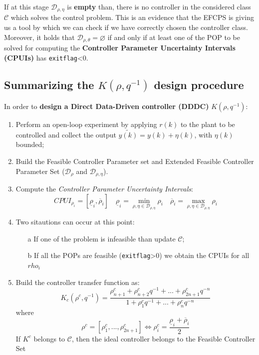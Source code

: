 If at this stage $\mathcal{D}_{\rho,\eta}$ is \textbf{empty} than, there is no controller in the considered class $\mathcal{C}$ which solves the control problem. This is an evidence that the EFCPS is giving us a tool by which we can check if we have correctly chosen the controller class. \\
Moreover, it holds that $\mathcal{D}_{\rho, \theta}=\varnothing $ if and only if at least one of the POP to be solved for computing the \textbf{Controller Parameter Uncertainty Intervals (CPUIs)} has \texttt{exitflag}<0. 

\subsection{Summarizing the $K(\rho,q^{-1})$ design procedure}
In order to \textbf{design a Direct Data-Driven controller (DDDC)} $K(\rho,q^{-1})$: 
\begin{enumerate}
    \itemsep-0.3em
    \item Perform an open-loop experiment by applying $r(k)$ to the plant to be controlled and collect the output $\tilde{y(k)}=y(k)+\eta(k)$, with $\eta(k)$ bounded; 
    \item Build the Feasible Controller Parameter set and Extended Feasible Controller Parameter Set ($\mathcal{D}_{\rho}$ and $\mathcal{D}_{\rho,\eta}$).
    \item Compute the \textit{Controller Parameter Uncertainty Intervals}:
    \begin{equation}
        CPUI_{\rho_i}=[\underline{\rho}_i, \overline{\rho}_i] \quad 
        \underline{\rho}_i= \min_{\rho,\eta \in \mathcal{D}_{\rho,\eta}} \rho_i \quad
        \overline{\rho}_i= \max_{\rho,\eta \in \mathcal{D}_{\rho,\eta}} \rho_i 
    \end{equation}
    \item Two sitautions can occur at this point:
    \vspace{-0.3cm}
    \begin{itemize}
        \itemsep-0.3em
        \item[a] If one of the problem is infeasible than update $\mathcal{C}$;
        \item[b] If all the POPs are feasible (\texttt{exitflag}>0) we obtain the CPUIs for all $rho_i$
    \end{itemize}
    \item Build the controller transfer function as:
    \begin{equation}
        K_c(\rho^c,q^{-1})=\frac{\rho^c_{n+1} + \rho^c_{n+2}q^{-1}+...+\rho^c_{2n+1} q^{-n}}
        {1+\rho_1^c q^{-1}+...+\rho_n^c q^{-n}}
    \end{equation}
    where
    \begin{equation}
        \rho^c =[\rho^c_1,..., \rho^c_{2n+1}] \iff \rho_i^c = \frac{\underline{\rho}_i+\overline{\rho}_i}{2}
    \end{equation}
    \noindent
    If $K^c$ belongs to $\mathcal{C}$, then the ideal controller belongs to the Feasible Controller Set
\end{enumerate}

